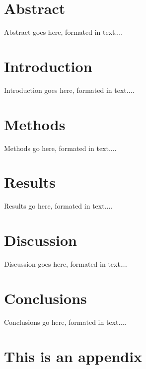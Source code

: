 \documentclass[a4paper,12pt]{article}
\begin{document}
\section*{Abstract}
Abstract goes here, formated in text....

\newpage

\phantom{p}
\vfill

\newpage

\tableofcontents
\listoffigures 
\listoftables

\newpage

\section{Introduction}
\setcounter{equation}{0}



Introduction goes here, formated in text....

\section{Methods}
\setcounter{equation}{0}

Methods go here, formated in text....

\section{Results}
\setcounter{equation}{0}

Results go here, formated in text....

\section{Discussion}
\setcounter{equation}{0}

Discussion goes here, formated in text....


\section{Conclusions}
\setcounter{equation}{0}

Conclusions go here, formated in text....

\appendix

\section{This is an appendix}
\setcounter{equation}{0}
\end{document}
